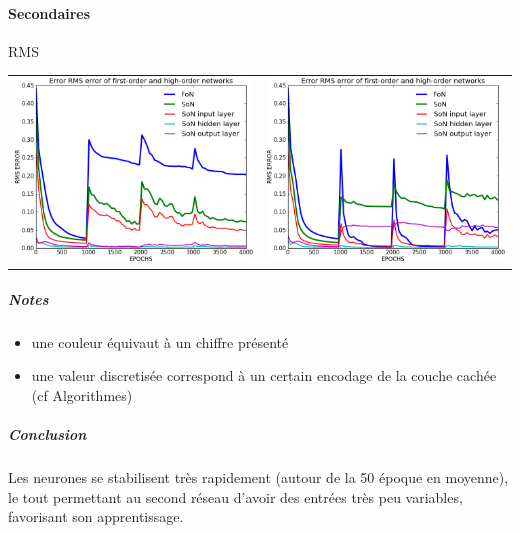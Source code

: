     \paragraph{Secondaires}
      RMS
      \begin{center}
	\begin{tabular}{lr}
	  \hspace*{-1cm}
	  \includegraphics[width=250px]{data/expB1/rms.png}
	  &
	  \includegraphics[width=250px]{data/expB1/rms_block.png} 
	\end{tabular}
      \end{center} 
      \subparagraph{Notes}
	\begin{itemize}
	  \item une couleur équivaut à un chiffre présenté
	  \item une valeur discretisée correspond à un certain encodage de la couche cachée (cf Algorithmes)
	\end{itemize}
      \subparagraph{Conclusion}
	Les neurones se stabilisent très rapidement (autour de la 50 époque en moyenne), 
	le tout permettant au second réseau d'avoir des entrées très peu variables, favorisant
	son apprentissage.
